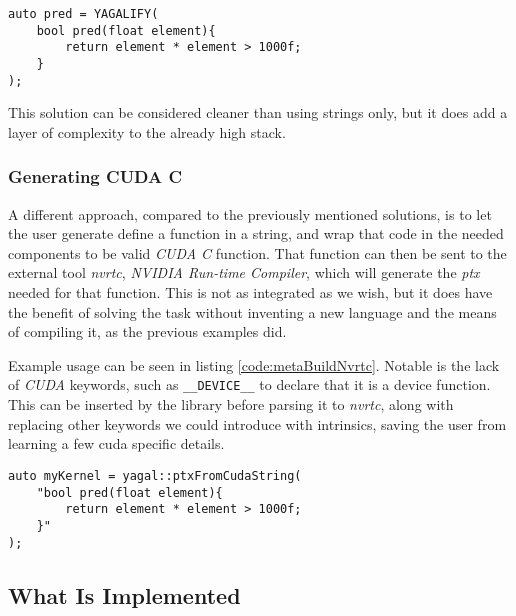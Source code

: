 \begin{lstlisting}[caption={Code showing possible construction of kernel with macro, named YAGALIFY, and c++ lambda.}, label={code:metaBuildMacro}]
auto pred = YAGALIFY(
    bool pred(float element){
        return element * element > 1000f;
    }
);
\end{lstlisting}

This solution can be considered cleaner than using strings only, but it does add a layer of complexity to the already high stack.

\subsubsection{Generating CUDA C}
A different approach, compared to the previously mentioned solutions, is to let the user generate define a function in a string, and wrap that code in the needed components to be valid \textit{CUDA C} function. That function can then be sent to the external tool \textit{nvrtc}, \textit{NVIDIA Run-time Compiler}, which will generate the \textit{ptx} needed for that function. This is not as integrated as we wish, but it does have the benefit of solving the task without inventing a new language and the means of compiling it, as the previous examples did.

Example usage can be seen in listing \ref{code:metaBuildNvrtc}. Notable is the lack of \textit{CUDA} keywords, such as \texttt{\_\_DEVICE\_\_} to declare that it is a device function. This can be inserted by the library before parsing it to \textit{nvrtc}, along with replacing other keywords we could introduce with intrinsics, saving the user from learning a few cuda specific details.

\begin{lstlisting}[caption={Code showing possible construction of kernel with a string, being sent to the library, where it get extended to correct \textit{CUDA C}, before being sent to \textit{nvrtc}.}, label={code:metaBuildNvrtc}]
auto myKernel = yagal::ptxFromCudaString(
    "bool pred(float element){
        return element * element > 1000f;
    }"
);
\end{lstlisting}

\subsection{What Is Implemented}
